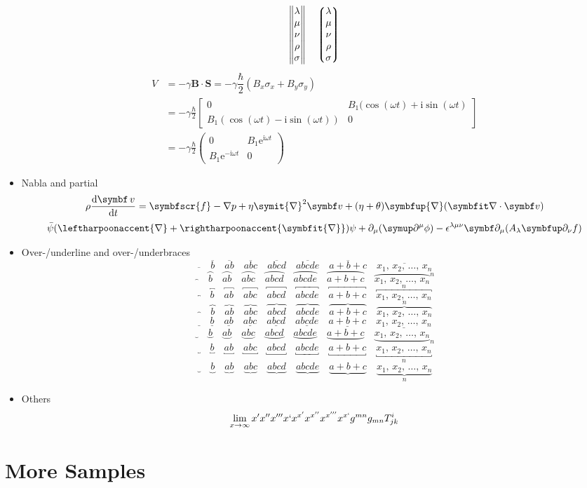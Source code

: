 \documentclass{article}
\def\MATRIXV{\lambda\\\mu\\\nu\\\rho\\\sigma}
\def\OVERUNDERLINE#1{%
  #1{} \quad #1{b} \quad #1{ab} \quad #1{abc} \quad #1{abcd} \quad #1{abcde} \quad #1{a+b+c}}
\def\LISTTEXT{x_1, \, x_2, \, \ldots, \, x_n}
\def\ee{\mathrm{e}}
\def\ii{\mathrm{i}}
\begin{document}
\begin{itemize}
\[        \begin{Vmatrix} \MATRIXV  \end{Vmatrix} \quad
        \left\lgroup \begin{matrix}
        \MATRIXV
        \end{matrix} \right\rgroup
        \]
        \[\begin{split}
        V&{}=-\gamma \mathbf{B}\cdot \mathbf{S}=-\gamma\dfrac{\hbar}{2}(B_x{\sigma}_x+B_y{\sigma}_y)\\
        &{}=-\gamma\frac{\hbar}{2}\begin{bmatrix}0&B_1(\cos(\omega t)+\ii \sin(\omega t)\\B_1(\cos(\omega t)-\ii \sin(\omega t))&0\end{bmatrix}\\
        &{}=-\gamma\frac{\hbar}{2}\begin{pmatrix}0&B_1\ee^{\ii\omega t}\\B_1\ee^{-\ii \omega t}&0\end{pmatrix}
        \end{split}\]
  \item Nabla and partial
        \[ \rho\frac{\dd \symbf v}{\dd t}=\symbfscr{f}-\nabla p+\eta \symit{\nabla}^2 \symbf v+(\eta+\theta)\symbfup{\nabla}(\symbfit\nabla\cdot\symbf v)\]
        \[\bar{\psi}(\leftharpoonaccent{\nabla}+\rightharpoonaccent{\symbfit{\nabla}})\psi+\partial_\mu(\symup\partial^\mu\phi)-\epsilon^{\lambda\mu\nu}\symbf\partial_\mu(A_\lambda\symbfup\partial_\nu f)\]
  \item Over-/underline and over-/underbraces
        \[ \OVERUNDERLINE{\overline}     \quad \overline     {\LISTTEXT}   \]
        \[ \OVERUNDERLINE{\overparen}    \quad \overparen    {\LISTTEXT}^n \]
        \[ \OVERUNDERLINE{\overbracket}  \quad \overbracket  {\LISTTEXT}^n \]
        \[ \OVERUNDERLINE{\overbrace}    \quad \overbrace    {\LISTTEXT}^n \]
        \[ \OVERUNDERLINE{\underline}    \quad \underline    {\LISTTEXT}   \]
        \[ \OVERUNDERLINE{\underparen}   \quad \underparen   {\LISTTEXT}_n \]
        \[ \OVERUNDERLINE{\underbracket} \quad \underbracket {\LISTTEXT}_n \]
        \[ \OVERUNDERLINE{\underbrace}   \quad \underbrace   {\LISTTEXT}_n \]

\item Others
\[ \lim_{x\to\infty} x' x'' x''' x` x^{x'} x^{x''} x^{x'''} x^{x`} g^{mn} g_{mn} T^{i}_{jk} \]
\end{itemize}
\section{More Samples}
\end{document}
